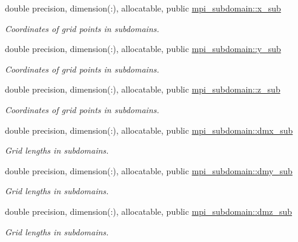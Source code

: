 \textbf{ }\par
\begin{DoxyCompactItemize}
\item 
double precision, dimension(\+:), allocatable, public \mbox{\hyperlink{namespacempi__subdomain_a978554e1520c79471ef3793ed1872b37}{mpi\+\_\+subdomain\+::x\+\_\+sub}}
\begin{DoxyCompactList}\small\item\em Coordinates of grid points in subdomains. \end{DoxyCompactList}\item 
double precision, dimension(\+:), allocatable, public \mbox{\hyperlink{namespacempi__subdomain_a58b09abee5f1002de7b20b1b86f5c821}{mpi\+\_\+subdomain\+::y\+\_\+sub}}
\begin{DoxyCompactList}\small\item\em Coordinates of grid points in subdomains. \end{DoxyCompactList}\item 
double precision, dimension(\+:), allocatable, public \mbox{\hyperlink{namespacempi__subdomain_aab6d78e49471a9a3db5ad9df4c3d4041}{mpi\+\_\+subdomain\+::z\+\_\+sub}}
\begin{DoxyCompactList}\small\item\em Coordinates of grid points in subdomains. \end{DoxyCompactList}\end{DoxyCompactItemize}

\textbf{ }\par
\begin{DoxyCompactItemize}
\item 
double precision, dimension(\+:), allocatable, public \mbox{\hyperlink{namespacempi__subdomain_a56af1740899dc9df6868e5e71a0884a5}{mpi\+\_\+subdomain\+::dmx\+\_\+sub}}
\begin{DoxyCompactList}\small\item\em Grid lengths in subdomains. \end{DoxyCompactList}\item 
double precision, dimension(\+:), allocatable, public \mbox{\hyperlink{namespacempi__subdomain_ae44efbff9669bfad03a79ab41b5e8ace}{mpi\+\_\+subdomain\+::dmy\+\_\+sub}}
\begin{DoxyCompactList}\small\item\em Grid lengths in subdomains. \end{DoxyCompactList}\item 
double precision, dimension(\+:), allocatable, public \mbox{\hyperlink{namespacempi__subdomain_afb6341d7362587d6fd0a06fe78ba4e3f}{mpi\+\_\+subdomain\+::dmz\+\_\+sub}}
\begin{DoxyCompactList}\small\item\em Grid lengths in subdomains. \end{DoxyCompactList}\end{DoxyCompactItemize}

